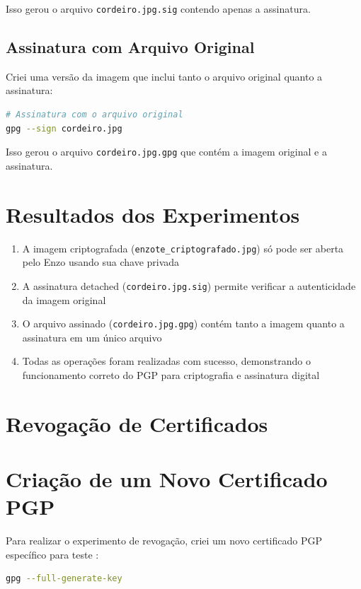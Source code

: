 Isso gerou o arquivo \texttt{cordeiro.jpg.sig} contendo apenas a assinatura.

\subsection{Assinatura com Arquivo Original}
Criei uma versão da imagem que inclui tanto o arquivo original quanto a assinatura:

\begin{lstlisting}[language=bash]
# Assinatura com o arquivo original
gpg --sign cordeiro.jpg
\end{lstlisting}

Isso gerou o arquivo \texttt{cordeiro.jpg.gpg} que contém a imagem original e a assinatura.

\section{Resultados dos Experimentos}
\begin{enumerate}
    \item A imagem criptografada (\texttt{enzote\_criptografado.jpg}) só pode ser aberta pelo Enzo usando sua chave privada
    \item A assinatura detached (\texttt{cordeiro.jpg.sig}) permite verificar a autenticidade da imagem original
    \item O arquivo assinado (\texttt{cordeiro.jpg.gpg}) contém tanto a imagem quanto a assinatura em um único arquivo
    \item Todas as operações foram realizadas com sucesso, demonstrando o funcionamento correto do PGP para criptografia e assinatura digital \cite{pgpbest}
\end{enumerate}

\section{Revogação de Certificados}

\section{Criação de um Novo Certificado PGP}
Para realizar o experimento de revogação, criei um novo certificado PGP específico para teste \cite{pgpbest}:

\begin{lstlisting}[language=bash]
gpg --full-generate-key
\end{lstlisting}

